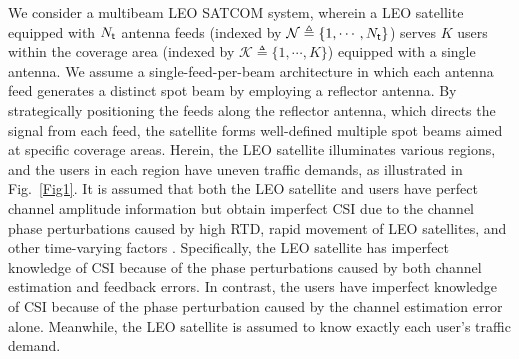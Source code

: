 \documentclass[draftclsnofoot, onecolumn, comsoc, 12pt]{IEEEtran}
\begin{document}
{ We consider a multibeam LEO SATCOM system, wherein a LEO satellite equipped with $N_{\sf{t}}$ antenna feeds (indexed by $\mathcal{N} \triangleq \{ 1,\cdots, N_{\sf{t}} \}$) serves $K$ users within the coverage area (indexed by $\mathcal{K} \triangleq \{ 1,\cdots, K \}$) equipped with a single antenna.}
{ We assume a single-feed-per-beam architecture \cite{perez2019signal} in which each antenna feed generates a distinct spot beam by employing a reflector antenna. By strategically positioning the feeds along the reflector antenna, which directs the signal from each feed, the satellite forms well-defined multiple spot beams aimed at specific coverage areas.}
{Herein, the LEO satellite illuminates various regions, and the users in each region have uneven traffic demands, as illustrated in Fig.~\ref{Fig1}.} 
{It is assumed that both the LEO satellite and users have perfect channel amplitude information but obtain imperfect CSI due to the channel phase perturbations caused by high RTD, rapid movement of LEO satellites, and other time-varying factors \cite{vazquez2016precoding, gharanjik2015robust, zhang2019robust, wang2021resource}.}
{Specifically, the LEO satellite has imperfect knowledge of CSI because of the phase perturbations caused by both channel estimation and feedback errors. In contrast, the users have imperfect knowledge of CSI because of the phase perturbation caused by the channel estimation error alone. Meanwhile, the LEO satellite is assumed to know exactly each user’s traffic demand.}


\end{document}
